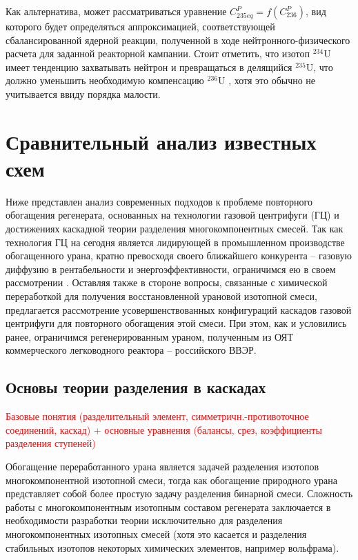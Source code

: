 Как альтернатива, может рассматриваться уравнение $C_{235 e q}^{P}=f\left(C_{236}^{P}\right)$, вид которого будет определяться аппроксимацией, соответствующей сбалансированной ядерной реакции, полученной в ходе нейтронного-физического расчета для заданной реакторной кампании.
Стоит отметить, что изотоп $^{234}$U имеет тенденцию захватывать нейтрон и превращаться в делящийся $^{235}$U, что должно уменьшить необходимую компенсацию $^{236}$U \cite{dyachenkoIspolzovanieRegenerirovannogoUrana2012}, хотя это обычно не учитывается ввиду порядка малости.

\section{Сравнительный анализ известных схем}\label{sec:ch1/sec2}

Ниже представлен анализ современных подходов к проблеме повторного обогащения регенерата, основанных на технологии газовой центрифуги (ГЦ) и достижениях каскадной теории разделения многокомпонентных смесей. Так как технология ГЦ на сегодня является лидирующей в промышленном производстве обогащенного урана, кратно превосходя своего ближайшего конкурента -- газовую диффузию в рентабельности и энергоэффективности, ограничимся ею в своем рассмотрении \cite{rothwellCostStructureInternational2008}.
Оставляя также в стороне вопросы, связанные с химической переработкой для получения восстановленной урановой изотопной смеси, предлагается рассмотрение усовершенствованных конфигураций каскадов газовой центрифуги для повторного обогащения этой смеси. При этом, как и условились ранее, ограничимся регенерированным ураном, полученным из ОЯТ коммерческого легководного реактора -- российского ВВЭР.

\subsection{Основы теории разделения в каскадах}\label{sec:ch1/sec2.1}

\textcolor{red}{Базовые понятия (разделительный элемент, симметричн.-противоточное соединений, каскад) + основные уравнения (балансы, срез, коэффициенты разделения ступеней)}

Обогащение переработанного урана является задачей разделения изотопов многокомпонентной изотопной смеси, тогда как обогащение природного урана представляет собой более простую задачу разделения бинарной смеси. Сложность работы с многокомпонентным изотопным составом регенерата заключается в необходимости разработки теории исключительно для разделения многокомпонентных изотопных смесей (хотя это касается и разделения стабильных изотопов некоторых химических элементов, например вольфрама).

